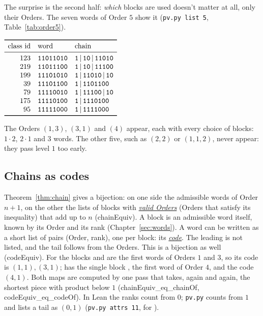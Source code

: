 \documentclass[10pt,a4paper,titlepage]{article}
\makeatletter
\newcommand{\termhere}[1]{\leavevmode
  \Hy@raisedlink{\hyper@anchorstart{term:#1}\hyper@anchorend}}
\newcommand{\keyterm}[2]{\hyperlink{box:#1}{\emph{#2}}}
\newcommand{\lean}[1]{\textsf{#1}}
\newcommand{\pv}[1]{\texttt{pv.py #1}}
\makeatother
\begin{document}
\nopagebreak
The surprise is the second half: \emph{which} blocks are used doesn't matter at
all, only their Orders. The seven words of Order $5$ show it (\pv{list 5}, Table~\ref{tab:order5}).

\begin{table}[htbp]
\centering
$\begin{array}{r l l}
\toprule
\text{class id} & \text{word} & \text{chain} \\
\midrule
123 & \bw{11011010} & \bw{1}\,|\,\bw{10}\,|\,\bw{11010} \\
219 & \bw{11011100} & \bw{1}\,|\,\bw{10}\,|\,\bw{11100} \\
199 & \bw{11101010} & \bw{1}\,|\,\bw{11010}\,|\,\bw{10} \\
39  & \bw{11101100} & \bw{1}\,|\,\bw{1101100} \\
79  & \bw{11110010} & \bw{1}\,|\,\bw{11100}\,|\,\bw{10} \\
175 & \bw{11110100} & \bw{1}\,|\,\bw{1110100} \\
95  & \bw{11111000} & \bw{1}\,|\,\bw{1111000} \\
\bottomrule
\end{array}$
\caption{The seven admissible words of Order $5$ and their chains.}
\label{tab:order5}
\end{table}

The Orders $(1,3)$, $(3,1)$ and $(4)$ appear, each with every choice of blocks:
$1\cdot 2$, $2 \cdot 1$ and $3$ words. The other five, such as $(2,2)$ or $(1,1,2)$,
never appear: they pass level $1$ too early.

\subsection*{Chains as codes}

\termhere{validorders}Theorem~\ref{thm:chain} gives a bijection: on one side the admissible words of Order
$n+1$, on the other the lists of blocks with \keyterm{validorders}{valid Orders} (Orders that satisfy its
inequality) that add up to $n$
(\lean{chainEquiv}). \termhere{code}A block is an admissible word itself, known by its Order and
its rank (Chapter~\ref{sec:words}). A word can be written as a short list of
pairs (Order, rank), one per block: its \keyterm{code}{code}. The leading  is not
listed, and the tail follows from the Orders. This is a bijection as well
(\lean{codeEquiv}). For  the blocks  and  are the
first words of Orders $1$ and $3$, so its code is $(1,1), (3,1)$; 
has the single block , the first word of Order $4$, and the code
$(4,1)$. Both maps are computed by one pass that takes, again and again, the
shortest piece with product below $1$ (\lean{chainEquiv\_eq\_chainOf},
\lean{codeEquiv\_eq\_codeOf}). In Lean the ranks count from $0$;
\texttt{pv.py} counts from $1$ and lists a tail as $(0,1)$ (\pv{attrs 11}, for ).
\end{document}

